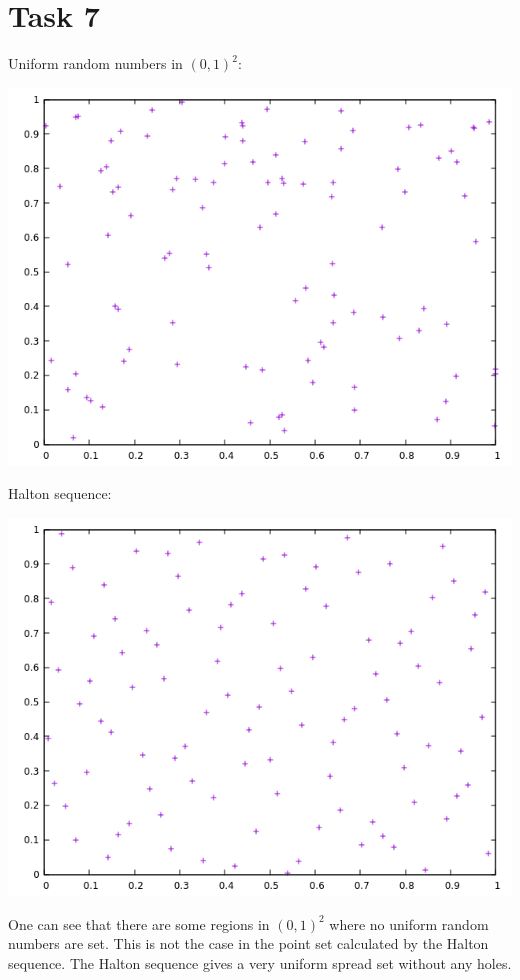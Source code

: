 \documentclass[10pt,a4paper]{article}
\begin{document}
\section*{Task 7}

Uniform random numbers in $(0,1)^2$:
\begin{center}
\includegraphics[scale=0.5]{uniform_random_numbers.png}		
\end{center}

Halton sequence:
\begin{center}
\includegraphics[scale=0.5]{halton_sequence.png}		
\end{center}

One can see that there are some regions in $(0,1)^2$ where no uniform random numbers are set. This is not the case in the point set calculated by the Halton sequence. The Halton sequence gives a very uniform spread set without any holes.
\end{document}
